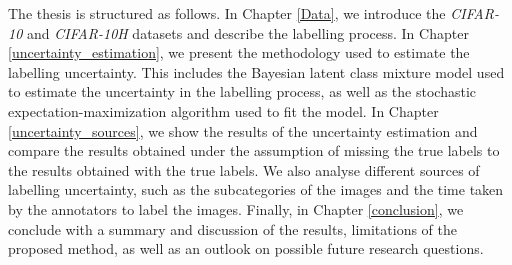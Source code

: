 The thesis is structured as follows. In Chapter \ref{Data}, we introduce the
\textit{CIFAR-10} and \textit{CIFAR-10H} datasets and describe the labelling
process. In Chapter \ref{uncertainty_estimation}, we present the methodology
used to estimate the labelling uncertainty. This includes the Bayesian latent
class mixture model used to estimate the uncertainty in the labelling process,
as well as the stochastic expectation-maximization algorithm used to fit the
model. In Chapter \ref{uncertainty_sources}, we show the results of the
uncertainty estimation and compare the results obtained under the assumption of
missing the true labels to the results obtained with the true labels. We also
analyse different sources of labelling uncertainty, such as the subcategories of
the images and the time taken by the annotators to label the images. Finally, in
Chapter \ref{conclusion}, we conclude with a summary and discussion of the
results, limitations of the proposed method, as well as an outlook on possible
future research questions.